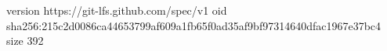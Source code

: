 version https://git-lfs.github.com/spec/v1
oid sha256:215c2d0086ca44653799af609a1fb65f0ad35af9bf97314640dfac1967e37bc4
size 392
